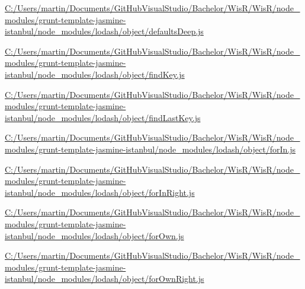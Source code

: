 \begin{DoxyCompactItemize}
\item 
\hyperlink{_c_1_2_users_2martin_2_documents_2_git_hub_visual_studio_2_bachelor_2_wis_r_2_wis_r_2node_module5b111c407d0cda69564a2989500dd9fe}{C\+:/\+Users/martin/\+Documents/\+Git\+Hub\+Visual\+Studio/\+Bachelor/\+Wis\+R/\+Wis\+R/node\+\_\+modules/grunt-\/template-\/jasmine-\/istanbul/node\+\_\+modules/lodash/object/defaults\+Deep.\+js}
\item 
\hyperlink{_c_1_2_users_2martin_2_documents_2_git_hub_visual_studio_2_bachelor_2_wis_r_2_wis_r_2node_module23387f7f64052d20b58277274521ad70}{C\+:/\+Users/martin/\+Documents/\+Git\+Hub\+Visual\+Studio/\+Bachelor/\+Wis\+R/\+Wis\+R/node\+\_\+modules/grunt-\/template-\/jasmine-\/istanbul/node\+\_\+modules/lodash/object/find\+Key.\+js}
\item 
\hyperlink{_c_1_2_users_2martin_2_documents_2_git_hub_visual_studio_2_bachelor_2_wis_r_2_wis_r_2node_module307245d45ed570a3e1eb46bfb79f843c}{C\+:/\+Users/martin/\+Documents/\+Git\+Hub\+Visual\+Studio/\+Bachelor/\+Wis\+R/\+Wis\+R/node\+\_\+modules/grunt-\/template-\/jasmine-\/istanbul/node\+\_\+modules/lodash/object/find\+Last\+Key.\+js}
\item 
\hyperlink{_c_1_2_users_2martin_2_documents_2_git_hub_visual_studio_2_bachelor_2_wis_r_2_wis_r_2node_module42c7a267d83f1620fe9c4f3f4362a4f0}{C\+:/\+Users/martin/\+Documents/\+Git\+Hub\+Visual\+Studio/\+Bachelor/\+Wis\+R/\+Wis\+R/node\+\_\+modules/grunt-\/template-\/jasmine-\/istanbul/node\+\_\+modules/lodash/object/for\+In.\+js}
\item 
\hyperlink{_c_1_2_users_2martin_2_documents_2_git_hub_visual_studio_2_bachelor_2_wis_r_2_wis_r_2node_modulee47d63a19f27a7b903518913a4e220d3}{C\+:/\+Users/martin/\+Documents/\+Git\+Hub\+Visual\+Studio/\+Bachelor/\+Wis\+R/\+Wis\+R/node\+\_\+modules/grunt-\/template-\/jasmine-\/istanbul/node\+\_\+modules/lodash/object/for\+In\+Right.\+js}
\item 
\hyperlink{_c_1_2_users_2martin_2_documents_2_git_hub_visual_studio_2_bachelor_2_wis_r_2_wis_r_2node_modulea9edb281c3382106b33d895e432cc9ca}{C\+:/\+Users/martin/\+Documents/\+Git\+Hub\+Visual\+Studio/\+Bachelor/\+Wis\+R/\+Wis\+R/node\+\_\+modules/grunt-\/template-\/jasmine-\/istanbul/node\+\_\+modules/lodash/object/for\+Own.\+js}
\item 
\hyperlink{_c_1_2_users_2martin_2_documents_2_git_hub_visual_studio_2_bachelor_2_wis_r_2_wis_r_2node_moduleaa7a98eb702283f4fdc8f8cde8af00bd}{C\+:/\+Users/martin/\+Documents/\+Git\+Hub\+Visual\+Studio/\+Bachelor/\+Wis\+R/\+Wis\+R/node\+\_\+modules/grunt-\/template-\/jasmine-\/istanbul/node\+\_\+modules/lodash/object/for\+Own\+Right.\+js}

\end{DoxyCompactItemize}
